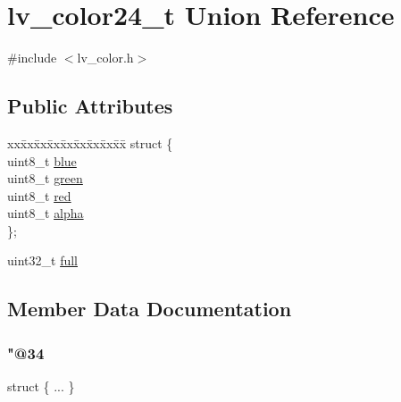 \hypertarget{unionlv__color24__t}{}\section{lv\+\_\+color24\+\_\+t Union Reference}
\label{unionlv__color24__t}


{\ttfamily \#include $<$lv\+\_\+color.\+h$>$}

\subsection*{Public Attributes}
\begin{DoxyCompactItemize}
\item 
\begin{tabbing}
xx\=xx\=xx\=xx\=xx\=xx\=xx\=xx\=xx\=\kill
struct \{\\
\>uint8\_t \mbox{\hyperlink{unionlv__color24__t_aeb4ffbb0b3a0400da9755fa6ddb2fb98}{blue}}\\
\>uint8\_t \mbox{\hyperlink{unionlv__color24__t_a9319cf96aea737304b8908916292fd08}{green}}\\
\>uint8\_t \mbox{\hyperlink{unionlv__color24__t_a582646ae95cac3a814f33f8e880ebc0b}{red}}\\
\>uint8\_t \mbox{\hyperlink{unionlv__color24__t_a272588786569f514ecfad0493212905d}{alpha}}\\
\}; \\

\end{tabbing}\item 
uint32\+\_\+t \mbox{\hyperlink{unionlv__color24__t_a135b69f280735fd94beafa33f8853c14}{full}}
\end{DoxyCompactItemize}


\subsection{Member Data Documentation}
\mbox{\label{unionlv__color24__t_abaa46d79db355a666daf6fb808fe03ba}} 
\subsubsection{\texorpdfstring{"@34}{@34}}
{\footnotesize\ttfamily struct \{ ... \} }

\mbox{\label{unionlv__color24__t_a272588786569f514ecfad0493212905d}} 
